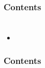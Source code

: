 \documentclass{beamer}
\title{}
\subtitle{}
\author{Guo Zhang}
\institute{WISE, Xiamen University}
\date{This Version: \today}
\begin{document}
\begin{frame}
\maketitle
\end{frame}

\begin{frame}[plain]
\frametitle{Contents}
\tableofcontents[hideallsubsections]
\end{frame}

\section{}
\begin{frame}
\frametitle{}
\begin{itemize}
\item 
\end{itemize}
\end{frame}

\begin{frame}[plain]
\frametitle{Contents}
\tableofcontents[hideallsubsections]
\end{frame}
\end{document}
